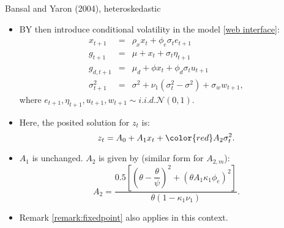 \begin{frame}{Bansal and Yaron (2004), heteroskedastic}
\begin{footnotesize}
\begin{itemize}
	\item BY then introduce conditional volatility in the model [\href{https://jrenne.shinyapps.io/LRRModels}{web interface}]:
	\begin{eqnarray}\label{eq:BY_heteroscked}
	x_{t+1} &=& \rho_x x_t + \phi_e \sigma_t e_{t+1} \nonumber\\
	g_{t+1} &=& \mu + x_t + \sigma_t \eta_{t+1} \nonumber\\
	g_{d,t+1} &=& \mu_d + \phi x_t + \phi_d \sigma_t u_{t+1} \nonumber\\
	\sigma_{t+1}^2 &=& \sigma^2 + \nu_1(\sigma^2_t -\sigma^2) + \sigma_w w_{t+1},
	\end{eqnarray}
	where $e_{t+1},\eta_{t+1},u_{t+1},w_{t+1} \sim i.i.d. \mathcal{N}(0,1)$.
	\item Here, the posited solution for $z_t$ is:
	$$
	z_t = A_0 + A_1 x_t + {\color{red}A_2 \sigma^2_t}.
	$$
	\item $A_1$ is unchanged. $A_2$ is given by (similar form for $A_{2,m}$):
	$$
	A_2 = \frac{0.5 \left[ \left(\theta - \dfrac{\theta}{\psi}\right)^2 + (\theta A_1 \kappa_1 \phi_e)^2 \right]}{\theta(1 - \kappa_1 \nu_1)}.
	$$
	\item Remark \ref{remark:fixedpoint} also applies in this context.
\end{itemize}
\end{footnotesize}
\end{frame}

